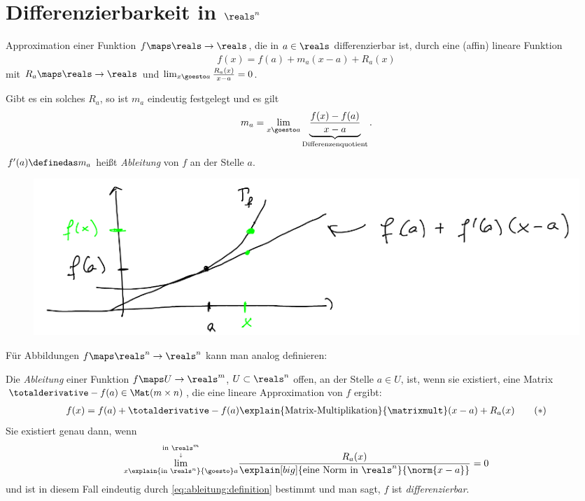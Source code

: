 \chapter{Differenzierbarkeit in \texorpdfstring{\( \reals^n \)}{R\^n}}
\begin{erinnerung*}
    Approximation einer Funktion \( f\maps \reals\to \reals \), die in \( a\in \reals \) differenzierbar ist, durch eine (affin) lineare Funktion
    \begin{align*}
        f(x)=f(a)+m_a(x-a)+R_a(x)
    \end{align*}
    mit \( R_a\maps \reals\to \reals \) und \( \lim_{x \goesto a}\frac{R_a(x)}{x-a}=0 \).

    Gibt es ein solches \( R_a \), so ist \( m_a \) eindeutig festgelegt und es gilt
    \begin{align*}
        m_a=\lim_{x \goesto a}\underbrace{\frac{f(x)-f(a)}{x-a}}_{\text{Differenzenquotient}}.
    \end{align*}
    \( f'(a)\definedas m_a \) heißt \emph{Ableitung} von \( f \) an der Stelle \( a \).
    \begin{figure}[H]
        \centering
        \includegraphics[width=0.7\linewidth]{figures/ableitung_erinnerung}
        \label{fig:ableitung_erinnerung}
    \end{figure}
    Für Abbildungen \( f\maps \reals^n\to \reals^n \) kann man analog definieren:
\end{erinnerung*}
\begin{definition}
    Die \emph{Ableitung} einer Funktion \( f\maps U\to \reals^m \), \( U\subset \reals^n \) offen, an der Stelle \( a\in U \), ist, wenn sie existiert, eine Matrix \( \totalderivative-{f}(a)\in \Mat(m\times n) \), die eine lineare Approximation von \( f \) ergibt:
    \begin{align*}
        f(x)=f(a)+\totalderivative-{f}(a)\explain{\text{Matrix-Multiplikation}}{\matrixmult}(x-a)+R_a(x)\tag{\(*\)}\label{eq:ableitung:definition}
    \end{align*}
    Sie existiert genau dann, wenn
    \begin{align*}
        \overset{\underset{\downarrow}{\text{in }\reals^m}}{\lim_{x\explain{\text{in }\reals^n}{\goesto} a}}\frac{R_a(x)}{\explain[big]{\text{eine Norm in \( \reals^n \)}}{\norm{x-a}}}=0
    \end{align*}
    und ist in diesem Fall eindeutig durch \eqref{eq:ableitung:definition} bestimmt und man sagt, \( f \) ist \emph{differenzierbar}.
\end{definition}
